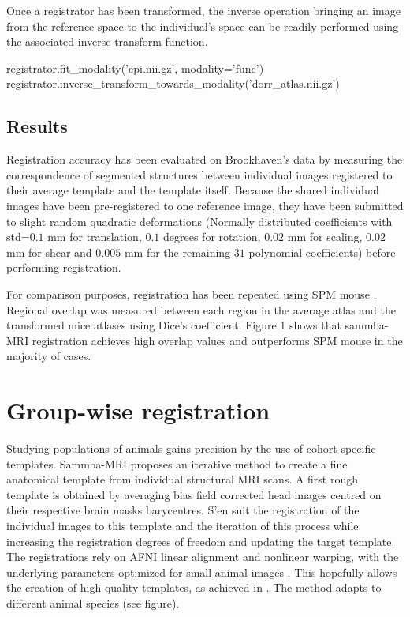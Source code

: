 \documentclass[utf8]{frontiersSCNS} %
\begin{document}
Once a registrator has been transformed, the inverse operation bringing an 
image from the reference space to the individual's space can be readily
performed using the associated inverse transform function.
\begin{python}
registrator.fit_modality('epi.nii.gz', modality='func')
registrator.inverse_transform_towards_modality('dorr_atlas.nii.gz')
\end{python}

\subsection{Results}
Registration accuracy has been evaluated on Brookhaven's data \citep{ma2008vivo} by 
measuring the correspondence of segmented structures between individual images 
registered 
to their average template and the template itself.
Because the shared individual images have been pre-registered to one reference image, 
they have been submitted to slight random quadratic deformations (Normally 
distributed coefficients with std=$0.1$ mm for translation, $0.1$ degrees for 
rotation, $0.02$ mm for scaling, $0.02$ mm for shear and $0.005$ mm for the remaining $31$ polynomial coefficients) before performing registration.

For comparison purposes, registration has been repeated using SPM mouse \citep{sawiak2009spmmouse}.
Regional overlap was measured
between each region in the average atlas and the transformed mice atlases 
using Dice's coefficient.
Figure 1 shows that sammba-MRI registration achieves
high overlap values and outperforms SPM mouse in the majority of cases.

\section{Group-wise registration} %
%
Studying populations of animals gains precision by the use of cohort-specific 
templates. Sammba-MRI proposes an iterative method to create a fine anatomical 
template from individual structural MRI scans. A first rough template is obtained
by averaging bias field corrected head images centred on their respective brain masks barycentres. S'en suit the registration of the individual images to this template
and the iteration of this process while increasing the registration degrees of 
freedom and updating the target template. The registrations rely on AFNI linear 
alignment and nonlinear warping, with the underlying parameters optimized
for small animal images \citep{nadkarni20193d}. This hopefully allows the creation of high quality
templates, as achieved in \citep{nadkarni2018digital}. The method adapts to different animal species (see figure).
\end{document}
